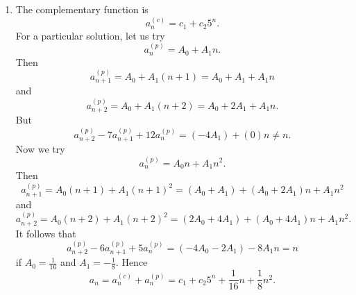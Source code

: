 \documentclass[a4paper]{article}
\begin{document}
\begin{enumerate}
\begin{enumerate}
			\item The complementary function is
			\begin{equation*}
				a_n^{(c)} = c_1 + c_2 5^n.
			\end{equation*}
			For a particular solution, let us try
			\begin{equation*}
				a_n^{(p)} = A_0 + A_1 n.
			\end{equation*}
			Then
			\begin{equation*}
				a_{n+1}^{(p)} = A_0 + A_1 (n + 1) = A_0 + A_1 + A_1 n
			\end{equation*}
			and
			\begin{equation*}
				a_{n+2}^{(p)} = A_0 + A_1 (n + 2) = A_0 + 2 A_1 + A_1 n.
			\end{equation*}
			But
			\begin{equation*}
				a_{n+2}^{(p)} - 7a_{n+1}^{(p)} + 12a_{n}^{(p)} = (- 4 A_1) + (0) n \ne n.
			\end{equation*}
			Now we try
			\begin{equation*}
				a_n^{(p)} = A_0 n + A_1 n^2.
			\end{equation*}
			Then
			\begin{equation*}
				a_{n+1}^{(p)} = A_0 (n + 1) + A_1 (n + 1)^2 = (A_0 + A_1) + (A_0 + 2 A_1) n + A_1 n^2
			\end{equation*}
			and
			\begin{equation*}
				a_{n+2}^{(p)} = A_0 (n + 2) + A_1 (n + 2)^2 = (2 A_0 + 4 A_1) + (A_0 + 4 A_1) n + A_1 n^2.
			\end{equation*}
			It follows that
			\begin{equation*}
				a_{n+2}^{(p)} - 6 a_{n+1}^{(p)} + 5 a_{n}^{(p)} = (- 4 A_0 - 2 A_1) - 8 A_1 n = n
			\end{equation*}
			if $A_0 = \frac{1}{16}$ and $A_1 = - \frac{1}{8}$. Hence
			\begin{equation*}
				a_n = a_n^{(c)} + a_n^{(p)} = c_1 + c_2 5^n + \frac{1}{16} n + \frac{1}{8} n^2.
			\end{equation*}
		\end{enumerate}
		

\end{enumerate}
\end{document}

